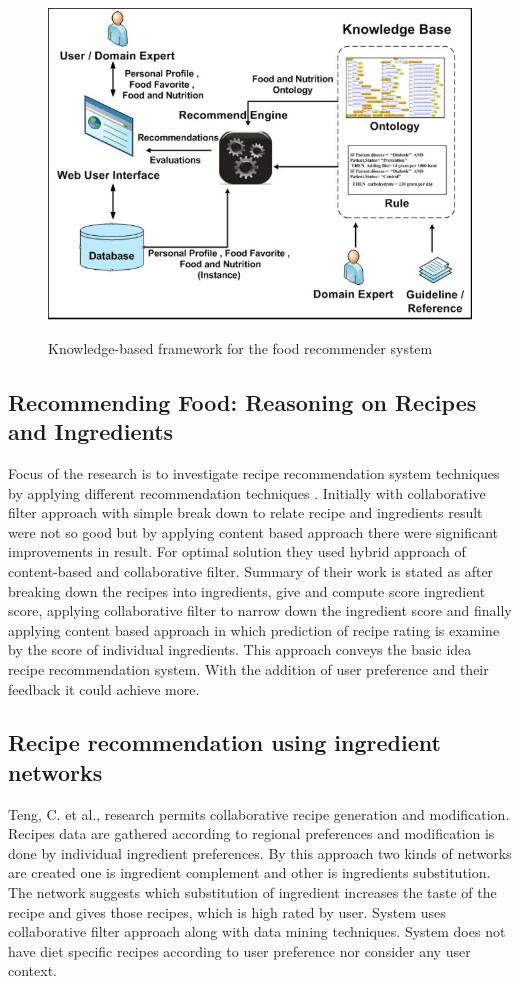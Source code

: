 \begin{figure}[h]
	\centering
	\includegraphics[width=.70\linewidth]{figures/ch2_suksom2010knowledge.png}
	\caption{Knowledge-based framework for the food recommender system}
	\cite{suksom2010knowledge}
	\label{fig:ch2_suksom2010knowledge}
\end{figure}

\subsection{Recommending Food: Reasoning on Recipes and Ingredients}

Focus of the research is to investigate recipe recommendation system techniques by applying different recommendation techniques \cite{freyne2010recommending}. Initially with collaborative filter approach with simple break down to relate recipe and ingredients result were not so good but by applying content based approach there were significant improvements in result. For optimal solution they used hybrid approach of content-based and collaborative filter. Summary of their work is stated as after breaking down the recipes into ingredients, give and compute score ingredient score, applying collaborative filter to narrow down the ingredient score and finally applying content based approach in which prediction of recipe rating is examine by the score of individual ingredients. This approach conveys the basic idea recipe recommendation system. With the addition of user preference and their feedback it could achieve more.

\subsection{Recipe recommendation using ingredient networks}

Teng, C. et al.,\cite{teng2012recipe} research permits collaborative recipe generation and modification. Recipes data are gathered according to regional preferences and modification is done by individual ingredient preferences. By this approach two kinds of networks are created one is ingredient complement and other is ingredients substitution. The network suggests which substitution of ingredient increases the taste of the recipe and gives those recipes, which is high rated by user. System uses collaborative filter approach along with data mining techniques. System does not have diet specific recipes according to user preference nor consider any user context. 

